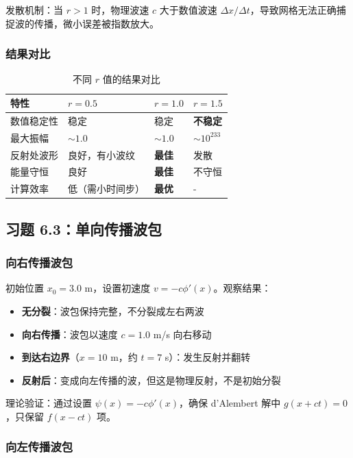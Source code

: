 \documentclass[12pt,a4paper]{article}
\begin{document}
发散机制：当 $r > 1$ 时，物理波速 $c$ 大于数值波速 $\Delta x/\Delta t$，导致网格无法正确捕捉波的传播，微小误差被指数放大。

\subsubsection{结果对比}

\begin{table}[H]
\centering
\caption{不同 $r$ 值的结果对比}
\begin{tabular}{llll}
\toprule
特性 & $r=0.5$ & $r=1.0$ & $r=1.5$ \\
\midrule
数值稳定性 & 稳定 & 稳定 & \textbf{不稳定} \\
最大振幅 & $\sim 1.0$ & $\sim 1.0$ & $\sim 10^{233}$ \\
反射处波形 & 良好，有小波纹 & \textbf{最佳} & 发散 \\
能量守恒 & 良好 & \textbf{最佳} & 不守恒 \\
计算效率 & 低（需小时间步） & \textbf{最优} & - \\
\bottomrule
\end{tabular}
\end{table}

\subsection{习题 6.3：单向传播波包}

\subsubsection{向右传播波包}

初始位置 $x_0 = 3.0$ m，设置初速度 $v = -c\phi'(x)$。观察结果：
\begin{itemize}
    \item \textbf{无分裂}：波包保持完整，不分裂成左右两波
    \item \textbf{向右传播}：波包以速度 $c = 1.0$ m/s 向右移动
    \item \textbf{到达右边界}（$x = 10$ m，约 $t = 7$ s）：发生反射并翻转
    \item \textbf{反射后}：变成向左传播的波，但这是物理反射，不是初始分裂
\end{itemize}

理论验证：通过设置 $\psi(x) = -c\phi'(x)$，确保 d'Alembert 解中 $g(x+ct) = 0$，只保留 $f(x-ct)$ 项。

\subsubsection{向左传播波包}
\end{document}
